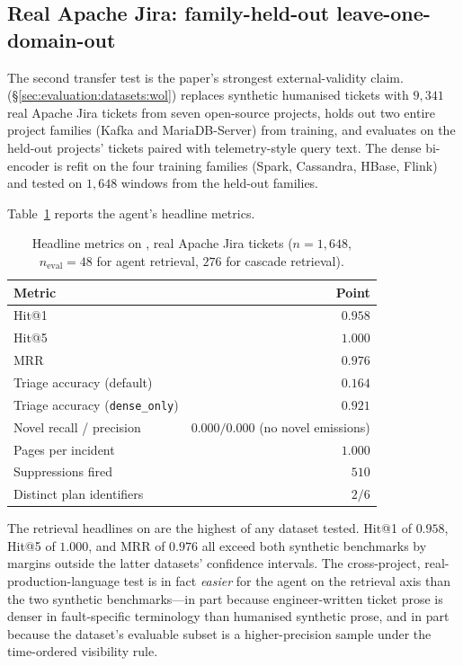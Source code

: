 \subsection{Real Apache Jira: family-held-out leave-one-domain-out}
\label{sec:cross-app:wol}

The second transfer test is the paper's strongest external-validity claim. \dswol{} (\S\ref{sec:evaluation:datasets:wol}) replaces synthetic humanised tickets with $9{,}341$ real Apache Jira tickets from seven open-source projects, holds out two entire project families (Kafka and MariaDB-Server) from training, and evaluates on the held-out projects' tickets paired with telemetry-style query text. The dense bi-encoder is refit on the four training families (Spark, Cassandra, HBase, Flink) and tested on $1{,}648$ windows from the held-out families.

Table~\ref{tab:headline-wol} reports the agent's headline metrics.

\begin{table}[ht]
  \centering
  \caption{Headline metrics on \dswol{}, real Apache Jira tickets ($n = 1{,}648$, $n_{\text{eval}} = 48$ for agent retrieval, $276$ for cascade retrieval).}
  \label{tab:headline-wol}
  \small
  \begin{tabular}{lr}
    \toprule
    Metric & Point \\
    \midrule
    Hit@1                      & $\mathbf{0.958}$ \\
    Hit@5                      & $\mathbf{1.000}$ \\
    MRR                        & $\mathbf{0.976}$ \\
    Triage accuracy (default)  & $0.164$ \\
    Triage accuracy (\texttt{dense\_only}) & $0.921$ \\
    Novel recall / precision   & $0.000 / 0.000$ (no novel emissions) \\
    Pages per incident         & $\mathbf{1.000}$ \\
    Suppressions fired         & $510$ \\
    Distinct plan identifiers  & $2 / 6$ \\
    \bottomrule
  \end{tabular}
\end{table}

The retrieval headlines on \dswol{} are the highest of any dataset tested. Hit@1 of $0.958$, Hit@5 of $1.000$, and MRR of $0.976$ all exceed both synthetic benchmarks by margins outside the latter datasets' confidence intervals. The cross-project, real-production-language test is in fact \emph{easier} for the agent on the retrieval axis than the two synthetic benchmarks---in part because engineer-written ticket prose is denser in fault-specific terminology than humanised synthetic prose, and in part because the dataset's evaluable subset is a higher-precision sample under the time-ordered visibility rule.

